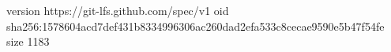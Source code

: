 version https://git-lfs.github.com/spec/v1
oid sha256:1578604acd7def431b8334996306ac260dad2efa533c8cecae9590e5b47f54fe
size 1183

